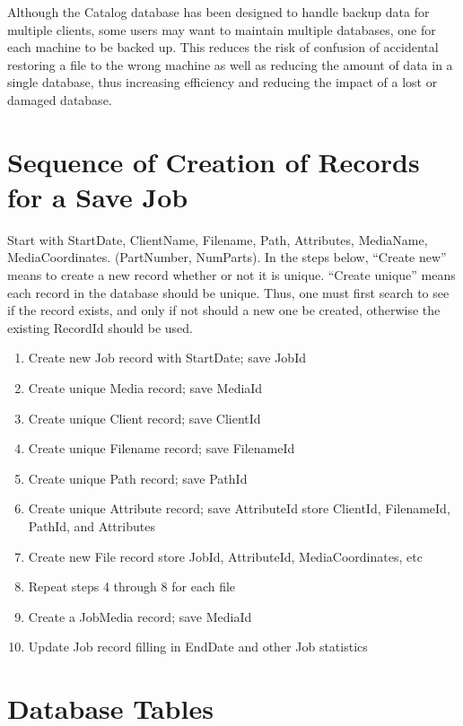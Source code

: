 {{{Although the Catalog database has been designed to handle backup data for
multiple clients, some users may want to maintain multiple databases, one for
each machine to be backed up. This reduces the risk of confusion of accidental
restoring a file to the wrong machine as well as reducing the amount of data
in a single database, thus increasing efficiency and reducing the impact of a
lost or damaged database.

\section{Sequence of Creation of Records for a Save Job}

Start with StartDate, ClientName, Filename, Path, Attributes, MediaName,
MediaCoordinates. (PartNumber, NumParts). In the steps below, ``Create new''
means to create a new record whether or not it is unique. ``Create unique''
means each record in the database should be unique. Thus, one must first
search to see if the record exists, and only if not should a new one be
created, otherwise the existing RecordId should be used.

\begin{enumerate}
\item Create new Job record with StartDate; save JobId
\item Create unique Media record; save MediaId
\item Create unique Client record; save ClientId
\item Create unique Filename record; save FilenameId
\item Create unique Path record; save PathId
\item Create unique Attribute record; save AttributeId
   store ClientId, FilenameId, PathId, and Attributes
\item Create new File record
   store JobId, AttributeId, MediaCoordinates, etc
\item Repeat steps 4 through 8 for each file
\item Create a JobMedia record; save MediaId
\item Update Job record filling in EndDate and other Job statistics
   \end{enumerate}

\section{Database Tables}

}}}
